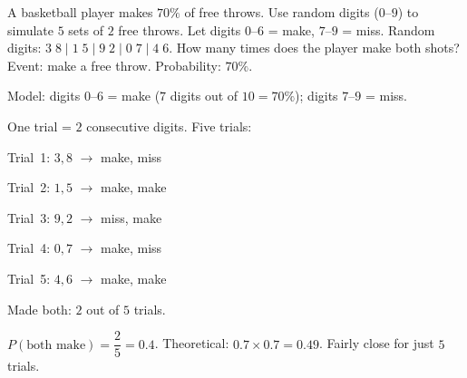 \begin{stepExample}{A basketball player makes $70\%$ of free throws. Use random digits ($0$--$9$) to simulate $5$ sets of $2$ free throws. Let digits $0$--$6$ = make, $7$--$9$ = miss. Random digits: $3\;8 \mid 1\;5 \mid 9\;2 \mid 0\;7 \mid 4\;6$. How many times does the player make both shots?}
     Event: make a free throw. Probability: $70\%$.

     Model: digits $0$--$6$ = make ($7$ digits out of $10 = 70\%$); digits $7$--$9$ = miss.

     One trial = $2$ consecutive digits. Five trials:\par
    Trial~1: $3, 8$ $\to$ make, miss\par
    Trial~2: $1, 5$ $\to$ make, make \checkmark\par
    Trial~3: $9, 2$ $\to$ miss, make\par
    Trial~4: $0, 7$ $\to$ make, miss\par
    Trial~5: $4, 6$ $\to$ make, make \checkmark

     Made both: $2$ out of $5$ trials.\par
    $P(\text{both make}) = \dfrac{2}{5} = 0.4$. Theoretical: $0.7 \times 0.7 = 0.49$. Fairly close for just $5$ trials.
\end{stepExample}


